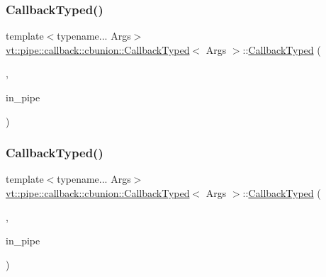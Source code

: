 \mbox{\label{structvt_1_1pipe_1_1callback_1_1cbunion_1_1_callback_typed_a4ac5a9e8138b2dc50264533a5a7334ef}} 
\subsubsection{\texorpdfstring{Callback\+Typed()}{CallbackTyped()}\hspace{0.1cm}{\footnotesize\ttfamily [7/12]}}
{\footnotesize\ttfamily template$<$typename... Args$>$ \\
\hyperlink{structvt_1_1pipe_1_1callback_1_1cbunion_1_1_callback_typed}{vt\+::pipe\+::callback\+::cbunion\+::\+Callback\+Typed}$<$ Args $>$\+::\hyperlink{structvt_1_1pipe_1_1callback_1_1cbunion_1_1_callback_typed}{Callback\+Typed} (\begin{DoxyParamCaption}\item[{Raw\+Send\+Col\+Msg\+Tag\+Type}]{,  }\item[{\hyperlink{namespacevt_ac9852acda74d1896f48f406cd72c7bd3}{Pipe\+Type} const \&}]{in\+\_\+pipe }\end{DoxyParamCaption})\hspace{0.3cm}{\ttfamily [inline]}}

\mbox{\label{structvt_1_1pipe_1_1callback_1_1cbunion_1_1_callback_typed_a36657b73ab1715cf79691e7a2ddb83e1}} 
\subsubsection{\texorpdfstring{Callback\+Typed()}{CallbackTyped()}\hspace{0.1cm}{\footnotesize\ttfamily [8/12]}}
{\footnotesize\ttfamily template$<$typename... Args$>$ \\
\hyperlink{structvt_1_1pipe_1_1callback_1_1cbunion_1_1_callback_typed}{vt\+::pipe\+::callback\+::cbunion\+::\+Callback\+Typed}$<$ Args $>$\+::\hyperlink{structvt_1_1pipe_1_1callback_1_1cbunion_1_1_callback_typed}{Callback\+Typed} (\begin{DoxyParamCaption}\item[{Raw\+Bcast\+Col\+Msg\+Tag\+Type}]{,  }\item[{\hyperlink{namespacevt_ac9852acda74d1896f48f406cd72c7bd3}{Pipe\+Type} const \&}]{in\+\_\+pipe }\end{DoxyParamCaption})\hspace{0.3cm}{\ttfamily [inline]}}

